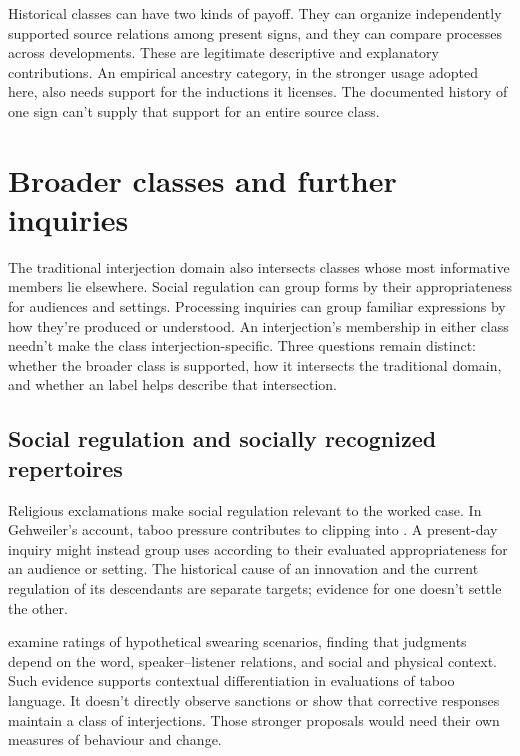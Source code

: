 \documentclass[12pt]{article}
\begin{document}
Historical classes can have two kinds of payoff. They can
organize independently supported source relations among present signs,
and they can compare processes across developments. These are legitimate
descriptive and explanatory contributions. An empirical ancestry category,
in the stronger usage adopted here, also needs support for the
inductions it licenses. The documented history of one sign can't supply
that support for an entire source class.

\section{Broader classes and further inquiries}\label{sec:extensions}

The traditional interjection domain also intersects classes whose most
informative members lie elsewhere. Social regulation can group forms
by their appropriateness for audiences and settings. Processing inquiries
can group familiar expressions by how they're produced or understood.
An interjection's membership in either class needn't make the class
interjection-specific. Three questions remain distinct: whether the
broader class is supported, how it intersects the traditional domain,
and whether an  label helps describe that intersection.

\subsection{Social regulation and socially recognized repertoires}

Religious exclamations make social regulation relevant to the worked
case. In Gehweiler's account, taboo pressure contributes to clipping
 into . A present-day inquiry might instead
group uses according to their evaluated appropriateness for an audience
or setting. The historical cause of an innovation and the current
regulation of its descendants are separate targets; evidence for one
doesn't settle the other.

\textcite{jayjanschewitz2008} examine ratings of hypothetical swearing scenarios,
finding that judgments depend on the word, speaker--listener relations,
and social and physical context. Such evidence
supports contextual differentiation in evaluations of taboo language.
It doesn't directly observe sanctions or show that corrective responses
maintain a class of interjections. Those stronger proposals would need
their own measures of behaviour and change.
\end{document}
